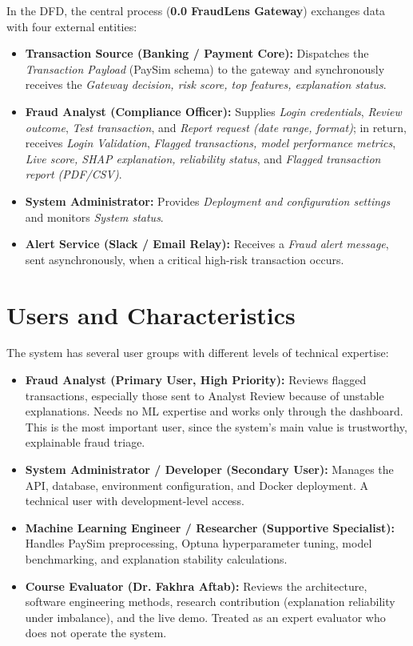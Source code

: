 \documentclass[12pt, a4paper]{report}
\begin{document}
In the DFD, the central process (\textbf{0.0 FraudLens Gateway}) exchanges data with four external entities:
\begin{itemize}
    \item \textbf{Transaction Source (Banking / Payment Core):} Dispatches the \textit{Transaction Payload} (PaySim schema) to the gateway and synchronously receives the \textit{Gateway decision, risk score, top features, explanation status}.
    \item \textbf{Fraud Analyst (Compliance Officer):} Supplies \textit{Login credentials}, \textit{Review outcome}, \textit{Test transaction}, and \textit{Report request (date range, format)}; in return, receives \textit{Login Validation}, \textit{Flagged transactions, model performance metrics}, \textit{Live score, SHAP explanation, reliability status}, and \textit{Flagged transaction report (PDF/CSV)}.
    \item \textbf{System Administrator:} Provides \textit{Deployment and configuration settings} and monitors \textit{System status}.
    \item \textbf{Alert Service (Slack / Email Relay):} Receives a \textit{Fraud alert message}, sent asynchronously, when a critical high-risk transaction occurs.
\end{itemize}

\section{Users and Characteristics}
The system has several user groups with different levels of technical expertise:
\begin{itemize}
    \item \textbf{Fraud Analyst (Primary User, High Priority):} Reviews flagged transactions, especially those sent to Analyst Review because of unstable explanations. Needs no ML expertise and works only through the dashboard. This is the most important user, since the system's main value is trustworthy, explainable fraud triage.
    \item \textbf{System Administrator / Developer (Secondary User):} Manages the API, database, environment configuration, and Docker deployment. A technical user with development-level access.
    \item \textbf{Machine Learning Engineer / Researcher (Supportive Specialist):} Handles PaySim preprocessing, Optuna hyperparameter tuning, model benchmarking, and explanation stability calculations.
    \item \textbf{Course Evaluator (Dr. Fakhra Aftab):} Reviews the architecture, software engineering methods, research contribution (explanation reliability under imbalance), and the live demo. Treated as an expert evaluator who does not operate the system.
\end{itemize}
\end{document}
